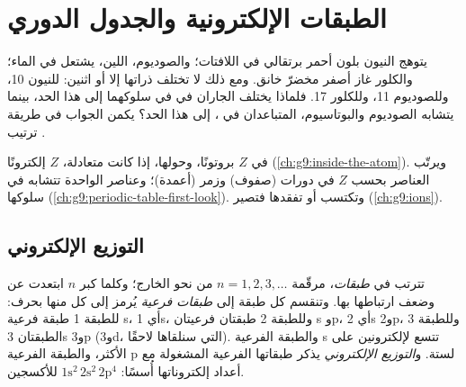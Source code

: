 \chapter{الطبقات الإلكترونية والجدول الدوري}\label{ch:g10:electron-shells}

يتوهج النيون بلون أحمر برتقالي في اللافتات؛ والصوديوم،  اللين، يشتعل في
الماء؛ والكلور غاز أصفر مخضرّ خانق. ومع ذلك لا تختلف ذراتها إلا  أو
اثنين: للنيون 10، وللصوديوم 11، وللكلور 17. فلماذا يختلف الجاران في  في سلوكهما إلى هذا الحد، بينما يتشابه الصوديوم والبوتاسيوم، المتباعدان
في ، إلى هذا الحد؟ يكمن الجواب في طريقة ترتيب  .

\begin{recall}
في   $Z$ بروتونًا، وحولها، إذا كانت متعادلة، $Z$ إلكترونًا
(\cref{ch:g9:inside-the-atom}). ويرتّب  العناصر بحسب $Z$ في
دورات (صفوف) وزمر (أعمدة)؛ وعناصر  الواحدة تتشابه في سلوكها
(\cref{ch:g9:periodic-table-first-look}). وتكتسب   أو تفقدها
فتصير  (\cref{ch:g9:ions}).
\end{recall}

\section{التوزيع الإلكتروني}

\begin{definition}\label{def:g10:electron-shells:configuration}
تترتب   في \emph{طبقات}، مرقّمة
$n = 1, 2, 3, \ldots$ من  نحو الخارج؛ وكلما كبر $n$ ابتعدت
 عن  وضعف ارتباطها بها. وتنقسم كل طبقة إلى
\emph{طبقات فرعية} يُرمز إلى كل منها بحرف: للطبقة 1 طبقة
فرعية s، أي 1s، وللطبقة 2 طبقتان فرعيتان s وp، أي 2s و2p، وللطبقة 3 الطبقتان 3s
و3p (و3d، التي سنلقاها لاحقًا). والطبقة الفرعية s تتسع لإلكترونين على
الأكثر، والطبقة الفرعية p لستة. و\emph{التوزيع الإلكتروني}
 يذكر طبقاتها الفرعية المشغولة مع أعداد إلكتروناتها أُسسًا:
$1\mathrm{s}^2\,2\mathrm{s}^2\,2\mathrm{p}^4$ للأكسجين.
\end{definition}

